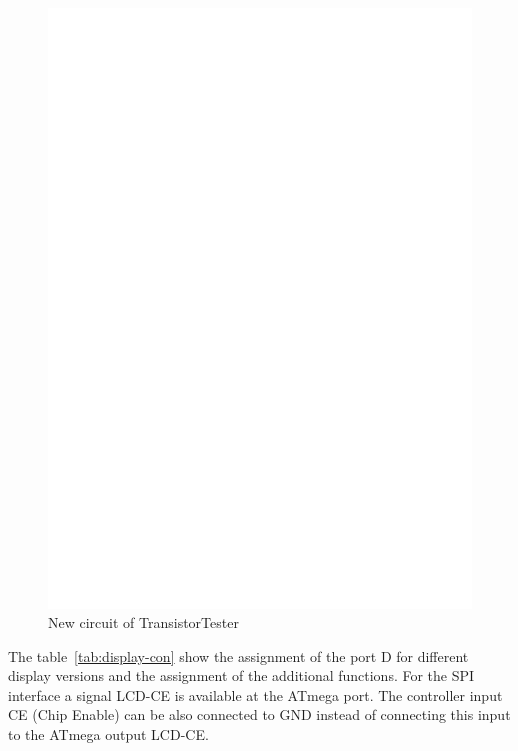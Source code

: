 \begin{figure}[H]
\centering
\includegraphics[width=18cm]{../FIG/ttester.eps}
\caption{New circuit of TransistorTester}
\label{fig:ttester}
\end{figure}

The table~\ref{tab:display-con} show the assignment of the port D for different display versions
and the assignment of the additional functions.
For the SPI interface a signal LCD-CE is available at the ATmega port. The controller input CE (Chip Enable) can 
be also connected to GND instead of connecting this input to the ATmega output LCD-CE.


